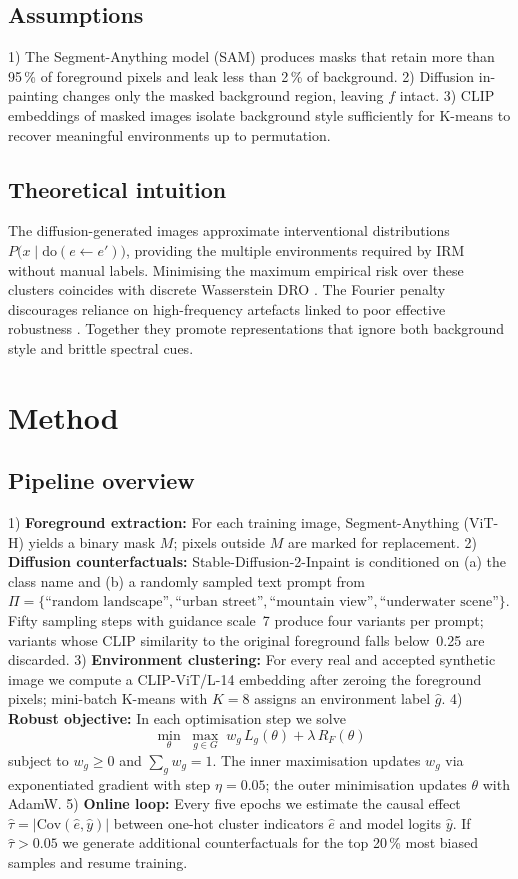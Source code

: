 \documentclass{article}
\begin{document}
\subsection{Assumptions}
1) The Segment-Anything model (SAM) produces masks that retain more than 95\,\% of foreground pixels and leak less than 2\,\% of background. 2) Diffusion in-painting changes only the masked background region, leaving $f$ intact. 3) CLIP embeddings of masked images isolate background style sufficiently for K-means to recover meaningful environments up to permutation.

\subsection{Theoretical intuition}
The diffusion-generated images approximate interventional distributions $P\bigl(x\mid \mathrm{do}(e\leftarrow e')\bigr)$, providing the multiple environments required by IRM \cite{arjovsky-2019-invariant} without manual labels. Minimising the maximum empirical risk over these clusters coincides with discrete Wasserstein DRO \cite{gao-2016-distributionally}. The Fourier penalty discourages reliance on high-frequency artefacts linked to poor effective robustness \cite{fridovichkeil-2022-models}. Together they promote representations that ignore both background style and brittle spectral cues.

\section{Method}
\subsection{Pipeline overview}
1) \textbf{Foreground extraction:} For each training image, Segment-Anything (ViT-H) yields a binary mask $M$; pixels outside $M$ are marked for replacement. 2) \textbf{Diffusion counterfactuals:} Stable-Diffusion-2-Inpaint is conditioned on (a) the class name and (b) a randomly sampled text prompt from $\Pi = \{\text{``random landscape''}, \text{``urban street''}, \text{``mountain view''}, \text{``underwater scene''}\}$. Fifty sampling steps with guidance scale~7 produce four variants per prompt; variants whose CLIP similarity to the original foreground falls below~0.25 are discarded. 3) \textbf{Environment clustering:} For every real and accepted synthetic image we compute a CLIP-ViT/L-14 embedding after zeroing the foreground pixels; mini-batch K-means with $K = 8$ assigns an environment label $\hat g$. 4) \textbf{Robust objective:} In each optimisation step we solve
\[
  \min_{\theta}\; \max_{g\in G}\; w_g\, L_g(\theta) + \lambda\, R_F(\theta)
\]
subject to $w_g \ge 0$ and $\sum_{g} w_g = 1$. The inner maximisation updates $w_g$ via exponentiated gradient with step $\eta = 0.05$; the outer minimisation updates $\theta$ with AdamW. 5) \textbf{Online loop:} Every five epochs we estimate the causal effect $\hat{\tau} = |\mathrm{Cov}(\hat e, \hat y)|$ between one-hot cluster indicators $\hat e$ and model logits $\hat y$. If $\hat{\tau} > 0.05$ we generate additional counterfactuals for the top 20\,\% most biased samples and resume training.
\end{document}
